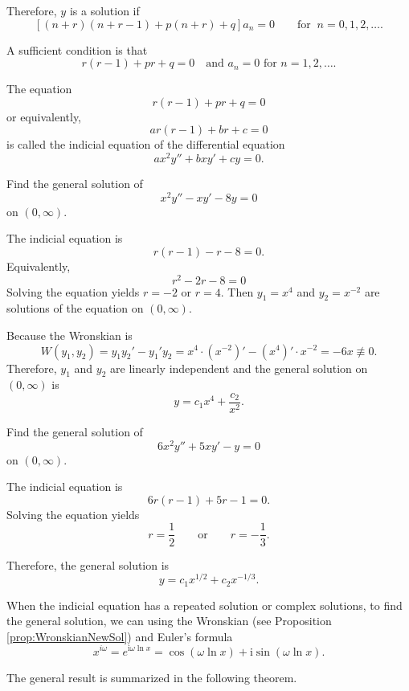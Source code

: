 Therefore, $y$ is a solution if
\[[(n+r)(n+r-1)+p(n+r)+q]a_n=0\qquad\text{for }~ n=0, 1, 2, \dots.\]

A sufficient condition is that
\[r(r-1)+pr+q=0
\quad\text{and } a_n=0 \text{ for } n=1, 2, \dots.\]

The equation
\[r(r-1)+pr+q=0\]
or equivalently,
\[ar(r-1)+br+c=0\]
is called the indicial equation of the differential equation
\[ax^2y''+bxy'+cy=0.\]

\begin{example}
Find the general solution of
\[x^2y''-xy'-8y=0\]
on $(0,\infty)$.
\end{example}
\begin{solution}
The indicial equation is
\[r(r-1)-r-8=0.\]
Equivalently,
\[r^2-2r-8=0\]
Solving the equation yields
$r=-2$ or $r=4$.
Then $y_1=x^4$ and $y_2=x^{-2}$ are solutions of the equation on $(0,\infty)$.

Because the Wronskian is
\[W(y_1, y_2)=y_1y_2'-y_1'y_2=x^4\cdot(x^{-2})'-(x^4)'\cdot x^{-2}=-6x\not\equiv 0.\]
Therefore, $y_1$ and $y_2$ are linearly independent and the general solution on $(0,\infty)$ is
\[y=c_1x^4+\frac{c_2}{x^2}.\]
\end{solution}

\begin{exercise}
Find the general solution of
\[6x^2y''+5xy'-y=0\]
on $(0,\infty)$.
\end{exercise}
\begin{exersol}
The indicial equation is
\[6r(r-1)+5r-1=0.\]
Solving the equation yields
\[r=\frac12 \qquad\text{or}\qquad r=-\frac13.\]

Therefore, the general solution is
\[y=c_1x^{1/2}+c_2x^{-1/3}.\]
\end{exersol}

When the indicial equation has a repeated solution or complex solutions, to find the general solution, we can using the Wronskian (see Proposition \ref{prop:WronskianNewSol}) and Euler's formula 
\[x^{i \omega}=e^{\mathrm{i}\omega\ln x}=\cos(\omega\ln x) + \mathrm{i}\sin(\omega\ln x).\]

The general result is summarized in the following theorem.

